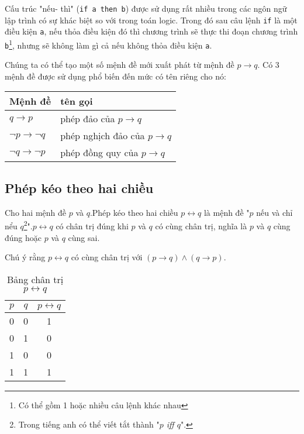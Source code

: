 \documentclass{standalone} %
\begin{document}
        Cấu trúc "nếu- thì" (\texttt{if a then b}) được sử dụng rất nhiều trong các ngôn ngữ lập trình có sự khác biệt so với trong toán logic. Trong đó sau câu lệnh \texttt{if} là một điều kiện \texttt{a}, nếu thỏa điều kiện đó thì chương trình sẽ thực thi đoạn chương trình \texttt{b}\footnote{Có thể gồm 1 hoặc nhiều câu lệnh khác nhau}, nhưng sẽ không làm gì cả nếu không thỏa điều kiện \texttt{a}.
        
        Chúng ta có thể tạo một số mệnh đề mới xuất phát từ mệnh đề $p \to q$. Có 3 mệnh đề được sử dụng phổ biến đến mức có tên riêng cho nó:
        \begin{table}[h!]
            \centering
            \setlength{\tabcolsep}{18pt}
            \begin{tabular}{l l}
                Mệnh đề & tên gọi\\ \hline
                $q \to p$ & phép đảo của $p \to q$\\
                $\neg p \to \neg q$ & phép nghịch đảo của $p \to q$\\
                $\neg q \to \neg p$ & phép đồng quy của $p \to q$
            \end{tabular}
        \end{table}
    \subsection{Phép kéo theo hai chiều} 
        \begin{definition}
            Cho hai mệnh đề $p$ và $q$.Phép kéo theo hai chiều $p \leftrightarrow q$ là mệnh đề "$p$ nếu và chỉ nểu $q$\footnote{
                Trong tiếng anh có thể viết tắt thành "\textit{$p$ iff $q$}".
            }".$p \leftrightarrow q$ có chân trị đúng khi $p$ và $q$ có cùng chân trị, nghĩa là $p$ và $q$ cùng đúng hoặc $p$ và $q$ cùng sai.
            
            Chú ý rằng $p \leftrightarrow q$ có cùng chân trị với $(p \to q) \land (q \to p)$.
        \end{definition}
        \begin{table}[h!]
            \centering
            \setlength{\tabcolsep}{18pt}
            \begin{tabular}{c c c}
                $p$ & $q$ & $p \leftrightarrow q$ \\ \hline
                0 & 0 & 1\\ 
                0 & 1 & 0\\
                1 & 0 & 0\\
                1 & 1 & 1
            \end{tabular}
            \caption{Bảng chân trị $p \leftrightarrow q$}
        \end{table}
        
\end{document}
